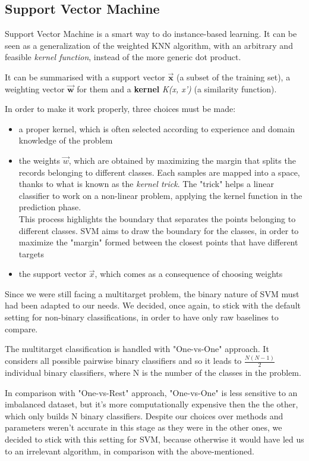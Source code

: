 \subsection{Support Vector Machine}
Support Vector Machine is a smart way to do instance-based learning. It can be seen as a generalization of the weighted KNN algorithm, with an arbitrary and feasible \textit{kernel function}, instead of the more generic dot product.

It can be summarised with a support vector $ \mathbf{\vec{x}} $ (a subset of the training set), a weighting vector $ \mathbf{\vec{w}} $ for them and a \textbf{kernel} \textit{K(x, x')} (a similarity function).

In order to make it work properly, three choices must be made:
\begin{itemize}
	\item[\PencilRight] a proper kernel, which is often selected according to experience and domain knowledge of the problem
	\item[\PencilRight] the weights $ \vec{w} $, which are obtained by maximizing the margin that splits the records belonging to different classes. Each samples are mapped into a space, thanks to what is known as the \textit{kernel trick}. The "trick" helps a linear classifier to work on a non-linear problem, applying the kernel function in the prediction phase.\\This process highlights the boundary that separates the points belonging to different classes.
	SVM aims to draw the boundary for the classes, in order to maximize the "margin" formed between the closest points that have different targets
	\item[\PencilRight] the support vector $ \vec{x} $, which comes as a consequence of choosing weights
\end{itemize}
Since we were still facing a multitarget problem, the binary nature of SVM must had been adapted to our needs. We decided, once again, to stick with the default setting for non-binary classifications, in order to have only raw baselines to compare.

The multitarget classification is handled with "One-vs-One" approach.
It considers all possible pairwise binary classifiers and so it leads to $\frac{N(N-1)}{2}$ individual binary classifiers, where N is the number of the classes in the problem.

In comparison with "One-vs-Rest" approach, "One-vs-One" is less sensitive to an imbalanced dataset, but it's more computationally expensive then the the other, which only builds N binary classifiers.
Despite our choices over methods and parameters weren't accurate in this stage as they were in the other ones, we decided to stick with this setting for SVM, because otherwise it would have led us to an irrelevant algorithm, in comparison with the above-mentioned.


